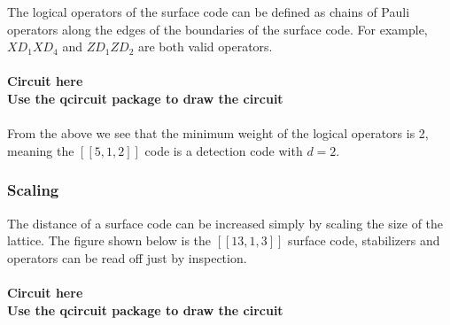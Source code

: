 The logical operators of the surface code can be defined as chains of Pauli operators along the edges of the boundaries of the surface code. For example, $XD_1XD_4$ and $ZD_1ZD_2$ are both valid operators.
\\
\\
\textbf{Circuit here}
\\
\textbf{Use the qcircuit package to draw the circuit}
\\
\\
From the above we see that the minimum weight of the logical operators is 2, meaning the $[[5,1,2]]$ code is a detection code with $d=2$.

\subsubsection{Scaling}

The distance of a surface code can be increased simply by scaling the size of the lattice. The figure shown below is the $[[13, 1, 3]]$ surface code, stabilizers and operators can be read off just by inspection.
\\
\\
\textbf{Circuit here}
\\
\textbf{Use the qcircuit package to draw the circuit}
\\
\\